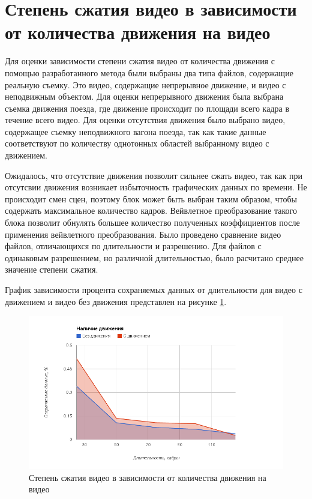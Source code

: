 \section{Степень сжатия видео в зависимости от количества движения на видео}

Для оценки зависимости степени сжатия видео от количества движения с помощью разработанного метода были выбраны два типа файлов, содержащие реальную съемку. Это видео, содержащие 
непрерывное движение, и видео с неподвижным объектом. 
Для оценки непрерывного движения была выбрана съемка движения поезда, где движение происходит по площади всего кадра в течение всего видео.
Для оценки отсутствия движения было выбрано видео, содержащее съемку неподвижного вагона поезда, так как такие данные соответствуют по количеству однотонных областей
выбранному видео с движением. 

Ожидалось, что отсутствие движения позволит сильнее сжать видео, так как при отсутсвии движения возникает избыточность графических данных по времени.
Не происходит смен сцен, поэтому блок может быть выбран таким образом, чтобы содержать максимальное количество кадров. Вейвлетное преобразование
такого блока позволит обнулять большее количество полученных коэффициентов после применения вейвлетного преобразования. 
Было проведено сравнение видео файлов, отличающихся по длительности и разрешению. Для файлов с одинаковым разрешением, но различной длительностью, было расчитано
среднее значение степени сжатия.

График зависимости процента сохраняемых данных от длительности для видео с движением и видео без движения представлен на рисунке \ref{fig:img1}.

\begin{figure}[ht]
  \centering
  \includegraphics[scale=0.6]{inc/graphics/image1.png}
  \caption{Степень сжатия видео в зависимости от количества движения на видео}
  \label{fig:img1}
\end{figure}

